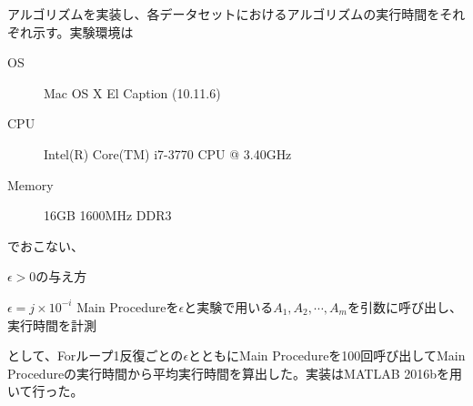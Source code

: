 アルゴリズムを実装し、各データセットにおけるアルゴリズムの実行時間をそれぞれ示す。実験環境は
\begin{description}
  \item[OS] Mac OS X El Caption (10.11.6)
  \item[CPU] Intel(R) Core(TM) i7-3770 CPU @ 3.40GHz
  \item[Memory] 16GB 1600MHz DDR3
\end{description}
でおこない、
\begin{algorithm}
  \caption{$\epsilon > 0$の与え方}
  \begin{algorithmic}
        \State $\epsilon = j \times 10^{-i}$
          \State Main Procedureを$\epsilon$と実験で用いる$A_1, A_2, \cdots, A_m$を引数に呼び出し、実行時間を計測
        \EndFor
      \EndFor
    \EndFor
  \end{algorithmic}
\end{algorithm}
として、Forループ1反復ごとの$\epsilon$とともにMain Procedureを100回呼び出してMain Procedureの実行時間から平均実行時間を算出した。実装はMATLAB 2016bを用いて行った。

